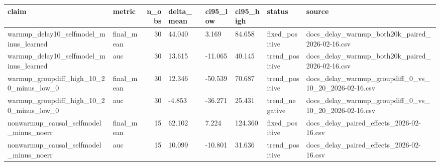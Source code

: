 \begin{tabular}{llrlllll}
\toprule
claim & metric & n_obs & delta_mean & ci95_low & ci95_high & status & source \\
\midrule
warmup_delay10_selfmodel_minus_learned & final_mean & 30 & 44.040 & 3.169 & 84.658 & fixed_positive & docs\stage2_delay_warmup_both20k_paired_2026-02-16.csv \\
warmup_delay10_selfmodel_minus_learned & auc & 30 & 13.615 & -11.065 & 40.145 & trend_positive & docs\stage2_delay_warmup_both20k_paired_2026-02-16.csv \\
warmup_groupdiff_high_10_20_minus_low_0 & final_mean & 30 & 12.346 & -50.539 & 70.687 & trend_positive & docs\stage2_delay_warmup_groupdiff_0_vs_10_20_2026-02-16.csv \\
warmup_groupdiff_high_10_20_minus_low_0 & auc & 30 & -4.853 & -36.271 & 25.431 & trend_negative & docs\stage2_delay_warmup_groupdiff_0_vs_10_20_2026-02-16.csv \\
nonwarmup_causal_selfmodel_minus_noerr & final_mean & 15 & 62.102 & 7.224 & 124.360 & fixed_positive & docs\stage2_delay_paired_effects_2026-02-16.csv \\
nonwarmup_causal_selfmodel_minus_noerr & auc & 15 & 10.099 & -10.801 & 31.636 & trend_positive & docs\stage2_delay_paired_effects_2026-02-16.csv \\
\bottomrule
\end{tabular}
